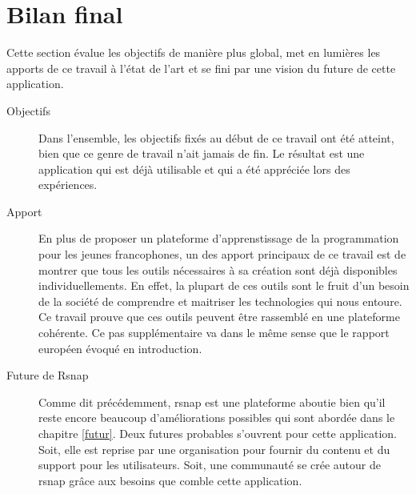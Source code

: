 \section{Bilan final}
Cette section évalue les objectifs de manière plus global, met en lumières les apports de ce travail à l'état de l'art et se fini par une vision du future de cette application.

\begin{description}
  \item[Objectifs] Dans l'ensemble, les objectifs fixés au début de ce travail ont été atteint, bien que ce genre de travail n'ait jamais de fin. Le résultat est une application qui est déjà utilisable et qui a été appréciée lors des expériences.

  \item[Apport] En plus de proposer un plateforme d'apprenstissage de la programmation pour les jeunes francophones, un des apport principaux de ce travail est de montrer que tous les outils nécessaires à sa création sont déjà disponibles individuellements. En effet, la plupart de ces outils sont le fruit d'un besoin de la société de comprendre et maitriser les technologies qui nous entoure. Ce travail prouve que ces outils peuvent être rassemblé en une plateforme cohérente. Ce pas supplémentaire va dans le même sense que le rapport européen \cite{rapport-europeen} évoqué en introduction.

  \item[Future de Rsnap] Comme dit précédemment, \gls{rsnap} est une plateforme aboutie bien qu'il reste encore beaucoup d'améliorations possibles qui sont abordée dans le chapitre \ref{futur}. Deux futures probables s'ouvrent pour cette application. Soit, elle est reprise par une organisation pour fournir du contenu et du support pour les utilisateurs. Soit, une communauté se crée autour de \gls{rsnap} grâce aux besoins que comble cette application.

\end{description}
